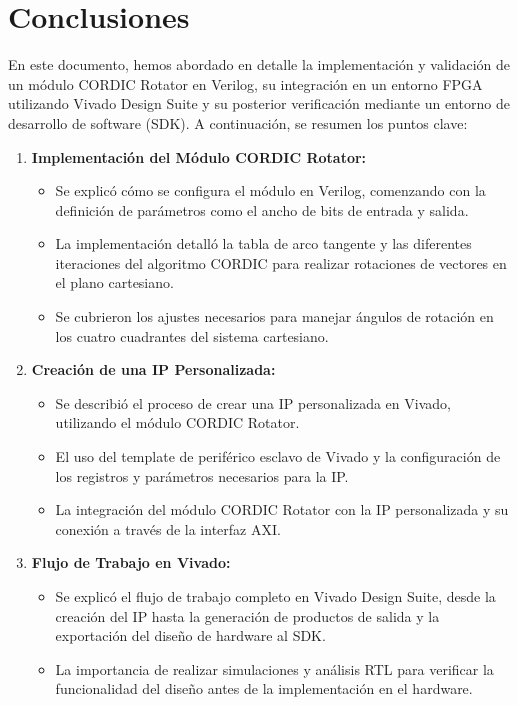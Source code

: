 \documentclass[12pt,a4paper, twoside]{article} %
\begin{document}
\newpage

\section{Conclusiones}

En este documento, hemos abordado en detalle la implementación y validación de un módulo CORDIC Rotator en Verilog, su integración en un entorno FPGA utilizando Vivado Design Suite y su posterior verificación mediante un entorno de desarrollo de software (SDK). A continuación, se resumen los puntos clave:

\begin{enumerate}
    \item \textbf{Implementación del Módulo CORDIC Rotator:}
    \begin{itemize}
        \item Se explicó cómo se configura el módulo en Verilog, comenzando con la definición de parámetros como el ancho de bits de entrada y salida.
        \item La implementación detalló la tabla de arco tangente y las diferentes iteraciones del algoritmo CORDIC para realizar rotaciones de vectores en el plano cartesiano.
        \item Se cubrieron los ajustes necesarios para manejar ángulos de rotación en los cuatro cuadrantes del sistema cartesiano.
    \end{itemize}
    
    \item \textbf{Creación de una IP Personalizada:}
    \begin{itemize}
        \item Se describió el proceso de crear una IP personalizada en Vivado, utilizando el módulo CORDIC Rotator.
        \item El uso del template de periférico esclavo de Vivado y la configuración de los registros y parámetros necesarios para la IP.
        \item La integración del módulo CORDIC Rotator con la IP personalizada y su conexión a través de la interfaz AXI.
    \end{itemize}
    
    \item \textbf{Flujo de Trabajo en Vivado:}
    \begin{itemize}
        \item Se explicó el flujo de trabajo completo en Vivado Design Suite, desde la creación del IP hasta la generación de productos de salida y la exportación del diseño de hardware al SDK.
        \item La importancia de realizar simulaciones y análisis RTL para verificar la funcionalidad del diseño antes de la implementación en el hardware.
    \end{itemize}
    

\end{enumerate}
\end{document}
